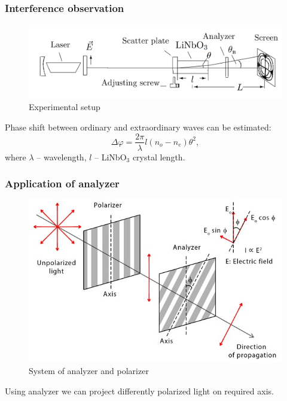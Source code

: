 \documentclass{beamer}
\begin{document}
	\begin{frame}
		\frametitle{Interference observation}
		
		\begin{figure}
			\centering
			\includegraphics[width=1\linewidth]{res/scheme}
			\caption{Experimental setup}
		\end{figure}
		
		Phase shift between ordinary and extraordinary waves can be estimated:
		$$
		\Delta \varphi = \frac{2\pi}{\lambda}l(n_o - n_e)\theta^2,
		$$
		where $\lambda$ -- wavelength, $l$ -- LiNbO$_3$ crystal length.
	\end{frame}

	\begin{frame}
		\frametitle{Application of analyzer}
		
		\begin{figure}
			\centering
			\includegraphics[width=0.8\linewidth]{res/malus_law.jpg}
			\caption{System of analyzer and polarizer}
		\end{figure}
		
		Using analyzer we can project differently polarized light on required axis.
	\end{frame}
	
\end{document}
